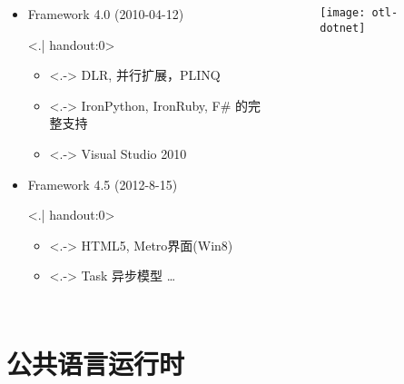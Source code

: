 \begin{frame}[t]
\begin{columns}[t]
\begin{itemize}[<+->]
\item Framework 4.0 (2010-04-12)

\only<.| handout:0>{
\begin{itemize}
\item<.-> DLR, 并行扩展，PLINQ
\item<.-> IronPython, IronRuby, F\# 的完整支持
\item<.-> Visual Studio 2010
\end{itemize}}

\item Framework 4.5 (2012-8-15)

\only<.| handout:0>{
\begin{itemize}
\item<.-> HTML5, Metro界面(Win8)
\item<.-> Task 异步模型 \ldots
\end{itemize}}
\end{itemize}

\begin{figure}
\centerline{\texttt{[image: otl-dotnet]}}
\end{figure}
\end{columns}
\end{frame}


\section{公共语言运行时}

